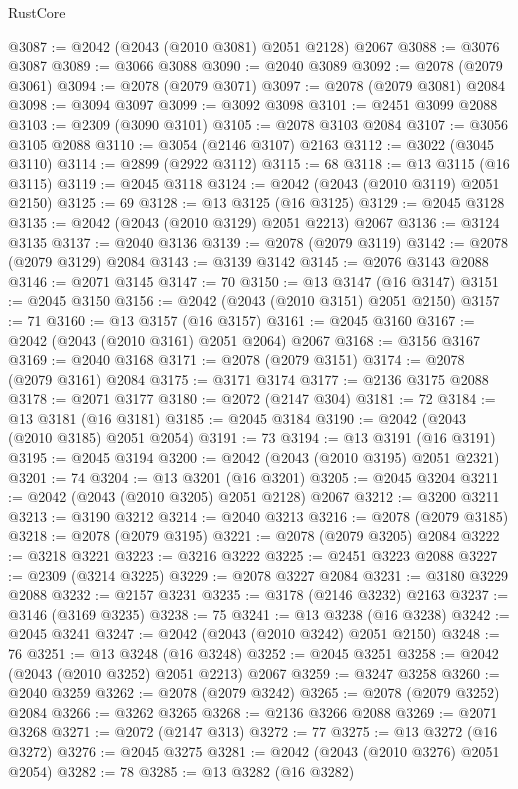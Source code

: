 \begin{lexlean}{RustCore}
\begin{coremodule}
@3087 := @2042 (@2043 (@2010 @3081) @2051 @2128) @2067
@3088 := @3076 @3087
@3089 := @3066 @3088
@3090 := @2040 @3089
@3092 := @2078 (@2079 @3061)
@3094 := @2078 (@2079 @3071)
@3097 := @2078 (@2079 @3081) @2084
@3098 := @3094 @3097
@3099 := @3092 @3098
@3101 := @2451 @3099 @2088
@3103 := @2309 (@3090 @3101)
@3105 := @2078 @3103 @2084
@3107 := @3056 @3105 @2088
@3110 := @3054 (@2146 @3107) @2163
@3112 := @3022 (@3045 @3110)
@3114 := @2899 (@2922 @3112)
@3115 := 68
@3118 := @13 @3115 (@16 @3115)
@3119 := @2045 @3118
@3124 := @2042 (@2043 (@2010 @3119) @2051 @2150)
@3125 := 69
@3128 := @13 @3125 (@16 @3125)
@3129 := @2045 @3128
@3135 := @2042 (@2043 (@2010 @3129) @2051 @2213) @2067
@3136 := @3124 @3135
@3137 := @2040 @3136
@3139 := @2078 (@2079 @3119)
@3142 := @2078 (@2079 @3129) @2084
@3143 := @3139 @3142
@3145 := @2076 @3143 @2088
@3146 := @2071 @3145
@3147 := 70
@3150 := @13 @3147 (@16 @3147)
@3151 := @2045 @3150
@3156 := @2042 (@2043 (@2010 @3151) @2051 @2150)
@3157 := 71
@3160 := @13 @3157 (@16 @3157)
@3161 := @2045 @3160
@3167 := @2042 (@2043 (@2010 @3161) @2051 @2064) @2067
@3168 := @3156 @3167
@3169 := @2040 @3168
@3171 := @2078 (@2079 @3151)
@3174 := @2078 (@2079 @3161) @2084
@3175 := @3171 @3174
@3177 := @2136 @3175 @2088
@3178 := @2071 @3177
@3180 := @2072 (@2147 @304)
@3181 := 72
@3184 := @13 @3181 (@16 @3181)
@3185 := @2045 @3184
@3190 := @2042 (@2043 (@2010 @3185) @2051 @2054)
@3191 := 73
@3194 := @13 @3191 (@16 @3191)
@3195 := @2045 @3194
@3200 := @2042 (@2043 (@2010 @3195) @2051 @2321)
@3201 := 74
@3204 := @13 @3201 (@16 @3201)
@3205 := @2045 @3204
@3211 := @2042 (@2043 (@2010 @3205) @2051 @2128) @2067
@3212 := @3200 @3211
@3213 := @3190 @3212
@3214 := @2040 @3213
@3216 := @2078 (@2079 @3185)
@3218 := @2078 (@2079 @3195)
@3221 := @2078 (@2079 @3205) @2084
@3222 := @3218 @3221
@3223 := @3216 @3222
@3225 := @2451 @3223 @2088
@3227 := @2309 (@3214 @3225)
@3229 := @2078 @3227 @2084
@3231 := @3180 @3229 @2088
@3232 := @2157 @3231
@3235 := @3178 (@2146 @3232) @2163
@3237 := @3146 (@3169 @3235)
@3238 := 75
@3241 := @13 @3238 (@16 @3238)
@3242 := @2045 @3241
@3247 := @2042 (@2043 (@2010 @3242) @2051 @2150)
@3248 := 76
@3251 := @13 @3248 (@16 @3248)
@3252 := @2045 @3251
@3258 := @2042 (@2043 (@2010 @3252) @2051 @2213) @2067
@3259 := @3247 @3258
@3260 := @2040 @3259
@3262 := @2078 (@2079 @3242)
@3265 := @2078 (@2079 @3252) @2084
@3266 := @3262 @3265
@3268 := @2136 @3266 @2088
@3269 := @2071 @3268
@3271 := @2072 (@2147 @313)
@3272 := 77
@3275 := @13 @3272 (@16 @3272)
@3276 := @2045 @3275
@3281 := @2042 (@2043 (@2010 @3276) @2051 @2054)
@3282 := 78
@3285 := @13 @3282 (@16 @3282)

\end{coremodule}
\end{lexlean}
